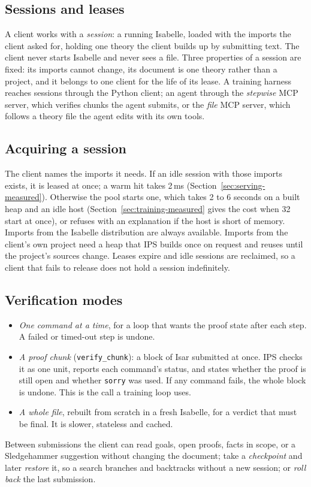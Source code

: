 \documentclass[11pt]{article}
\newcommand{\code}[1]{\colorbox{gray!12}{\texttt{\vphantom{Ag}#1}}}
\begin{document}
\subsection{Sessions and leases}

A client works with a \emph{session}: a running Isabelle, loaded with the
imports the client asked for, holding one theory the client builds up by
submitting text. The client never starts Isabelle and never sees a file.
Three properties of a session are fixed: its imports cannot change, its
document is one theory rather than a project, and it belongs to one
client for the life of its lease. A training harness reaches sessions
through the Python client; an agent through the \emph{stepwise} MCP
server, which verifies chunks the agent submits, or the \emph{file} MCP
server, which follows a theory file the agent edits with its own tools.

\subsection{Acquiring a session}

The client names the imports it needs. If an idle session with those
imports exists, it is leased at once; a warm hit takes 2\,ms
(Section~\ref{sec:serving-measured}). Otherwise the pool starts one, which
takes 2 to 6 seconds on a built heap and an idle host
(Section~\ref{sec:training-measured} gives the cost when 32 start at
once), or refuses with an explanation if the host is short of memory. Imports from the Isabelle distribution are
always available. Imports from the client's own project need a heap that
IPS builds once on request and reuses until the project's sources change.
Leases expire and idle sessions are reclaimed, so a client that fails to
release does not hold a session indefinitely.

\subsection{Verification modes}
\label{sec:modes}

\begin{itemize}
  \item \emph{One command at a time}, for a loop that wants the proof
    state after each step. A failed or timed-out step is undone.
  \item \emph{A proof chunk} (\code{verify\_chunk}): a block of Isar
    submitted at once. IPS checks it as one unit, reports each command's
    status, and states whether the proof is still open and whether
    \code{sorry} was used. If any command fails, the whole block is
    undone. This is the call a training loop uses.
  \item \emph{A whole file}, rebuilt from scratch in a fresh Isabelle,
    for a verdict that must be final. It is slower, stateless and cached.
\end{itemize}
Between submissions the client can read goals, open proofs, facts in
scope, or a Sledgehammer suggestion without changing the document; take a
\emph{checkpoint} and later \emph{restore} it, so a search branches and
backtracks without a new session; or \emph{roll back} the last submission.
\end{document}
